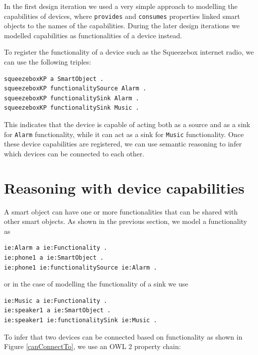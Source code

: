 In the first design iteration we used a very simple approach to modelling the capabilities of devices, where \texttt{provides} and \texttt{consumes} properties linked smart objects to the names of the capabilities. During the later design iterations we modelled capabilities as functionalities of a device instead.

To register the functionality of a device such as the Squeezebox internet radio, we can use the following triples:

\begin{verbatim}
squeezeboxKP a SmartObject .
squeezeboxKP functionalitySource Alarm .
squeezeboxKP functionalitySink Alarm .
squeezeboxKP functionalitySink Music .	
\end{verbatim}

This indicates that the device is capable of acting both as a source and as a sink for \texttt{Alarm} functionality, while it can act as a sink for \texttt{Music} functionality. Once these device capabilities are registered, we can use semantic reasoning to infer which devices can be connected to each other.



\section{Reasoning with device capabilities}

A smart object can have one or more functionalities that can be shared with other smart objects. As shown in the previous section, we model a functionality as 

\begin{verbatim}               
ie:Alarm a ie:Functionality .
ie:phone1 a ie:SmartObject .
ie:phone1 ie:functionalitySource ie:Alarm . 
\end{verbatim}

or in the case of modelling the functionality of a sink we use

\begin{verbatim}               
ie:Music a ie:Functionality .
ie:speaker1 a ie:SmartObject .
ie:speaker1 ie:functionalitySink ie:Music . 
\end{verbatim}

To infer that two devices can be connected based on functionality as shown in Figure \ref{canConnectTo}, we use an \ac{OWL} 2 property chain:\\

